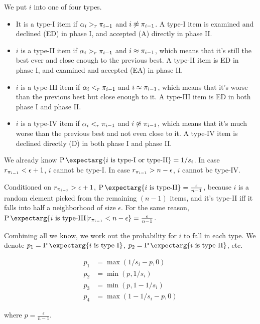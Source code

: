 \documentclass{article}
\newcommand{\prob}{\operatorname{P}\expectarg}
\begin{document}
We put $i$ into one of four types. 
\begin{itemize}
\item It is a type-I item if $\alpha_i >_r {\pi_{i-1}}$ and $i \not \approx {\pi_{i-1}}$. A type-I item is examined and declined (ED) in phase I, and accepted (A) directly in phase II.

\item $i$ is a type-II item if $\alpha_i >_r {\pi_{i-1}}$ and $i \approx {\pi_{i-1}}$, which means that it's still the best ever and close enough to the previous best. A type-II item is ED in phase I, and examined and accepted (EA) in phase II. 

\item $i$ is a type-III item if $\alpha_i <_r {\pi_{i-1}}$ and $i \approx {\pi_{i-1}}$, which means that it's worse than the previous best but close enough to it. A type-III item is ED in both phase I and phase II. 

\item $i$ is a type-IV item if $\alpha_i <_r {\pi_{i-1}}$ and $i \not \approx {\pi_{i-1}}$, which means that it's much worse than the previous best and not even close to it. A type-IV item is declined directly (D) in both phase I and phase II. 
\end{itemize}

We already know $\prob{i \text{ is type-I or type-II}} = 1/s_i$. In case $r_{\pi_{i-1}} < \epsilon+1$, $i$ cannot be type-I. In case $r_{\pi_{i-1}} > n-\epsilon$, $i$ cannot be type-IV.

Conditioned on $r_{\pi_{i-1}} > \epsilon+1$, $\prob{i \text{ is type-II}}= \frac{\epsilon}{n-1}$, because $i$ is a random element picked from the remaining $(n-1)$ items, and it's type-II iff it falls into half a neighborhood of size $\epsilon$. For the same reason, $\prob{i \text{ is type-III} | r_\BestSoFar < n - \epsilon}= \frac{\epsilon}{n-1}$.

Combining all we know, we work out the probability for $i$ to fall in each type. We denote $p_1 = \prob{i \text{ is type-I}}$, $p_2 = \prob{i \text{ is type-II}}$, etc.

\begin{align}
p_1 &= \max(1/s_i - p, 0)\\
p_2 &= \min(p, 1/s_i)\\
p_3 &= \min(p, 1-1/s_i)\\
p_4 &= \max(1-1/s_i-p, 0)
\end{align}

where $p = \frac{\epsilon}{n-1}$.
\end{document}
